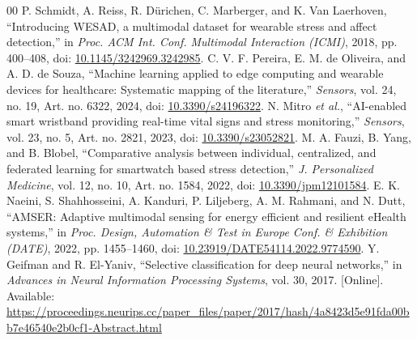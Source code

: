 \documentclass[conference,a4paper]{IEEEtran}
\begin{document}
\balance
\begin{thebibliography}{00}
 P. Schmidt, A. Reiss, R. D\"urichen, C. Marberger, and K. Van Laerhoven, ``Introducing WESAD, a multimodal dataset for wearable stress and affect detection,'' in \emph{Proc. ACM Int. Conf. Multimodal Interaction (ICMI)}, 2018, pp. 400--408, doi: \href{https://doi.org/10.1145/3242969.3242985}{10.1145/3242969.3242985}.
 C. V. F. Pereira, E. M. de Oliveira, and A. D. de Souza, ``Machine learning applied to edge computing and wearable devices for healthcare: Systematic mapping of the literature,'' \emph{Sensors}, vol. 24, no. 19, Art. no. 6322, 2024, doi: \href{https://doi.org/10.3390/s24196322}{10.3390/s24196322}.
 N. Mitro \emph{et al.}, ``AI-enabled smart wristband providing real-time vital signs and stress monitoring,'' \emph{Sensors}, vol. 23, no. 5, Art. no. 2821, 2023, doi: \href{https://doi.org/10.3390/s23052821}{10.3390/s23052821}.
 M. A. Fauzi, B. Yang, and B. Blobel, ``Comparative analysis between individual, centralized, and federated learning for smartwatch based stress detection,'' \emph{J. Personalized Medicine}, vol. 12, no. 10, Art. no. 1584, 2022, doi: \href{https://doi.org/10.3390/jpm12101584}{10.3390/jpm12101584}.
 E. K. Naeini, S. Shahhosseini, A. Kanduri, P. Liljeberg, A. M. Rahmani, and N. Dutt, ``AMSER: Adaptive multimodal sensing for energy efficient and resilient eHealth systems,'' in \emph{Proc. Design, Automation \& Test in Europe Conf. \& Exhibition (DATE)}, 2022, pp. 1455--1460, doi: \href{https://doi.org/10.23919/DATE54114.2022.9774590}{10.23919/DATE54114.2022.9774590}.
 Y. Geifman and R. El-Yaniv, ``Selective classification for deep neural networks,'' in \emph{Advances in Neural Information Processing Systems}, vol. 30, 2017. [Online]. Available: \url{https://proceedings.neurips.cc/paper_files/paper/2017/hash/4a8423d5e91fda00bb7e46540e2b0cf1-Abstract.html}
\end{thebibliography}
\end{document}
